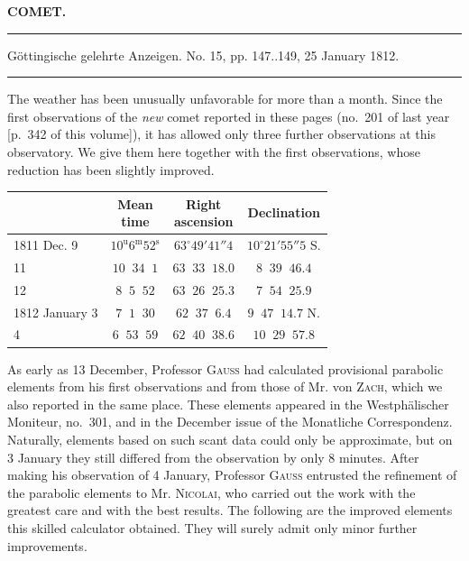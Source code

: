 \clearpage{}\hypertarget{native-350-lower}{}\label{native-350-lower}
\begin{center}\textbf{COMET.}\par\vspace{4pt}\hrule\vspace{4pt}\fontsize{10}{12}\selectfont Göttingische gelehrte Anzeigen. No. 15, pp. 147..149, 25 January 1812.\par\vspace{4pt}\hrule\vspace{4pt}\end{center}

\par\indent The weather has been unusually unfavorable for more than a month. Since the first observations of the \emph{new} comet reported in these pages (no.~201 of last year [p.~342 of this volume]), it has allowed only three further observations at this observatory. We give them here together with the first observations, whose reduction has been slightly improved.

\begin{center}
\fontsize{10}{12}\selectfont\setlength{\tabcolsep}{3pt}\renewcommand{\arraystretch}{1.15}\begin{tabular}{l|c|c|c}
 & \shortstack{Mean\\time} & \shortstack{Right\\ascension} & Declination \\
\hline
1811 Dec. 9 & $10^{\text{u}}6^{\text{m}}52^{\text{s}}$ & $63^\circ49'41''4$ & $10^\circ21'55''5$ S. \\
11 & $10\;\;34\;\;1$ & $63\;\;33\;\;18.0$ & $8\;\;39\;\;46.4$ \\
12 & $8\;\;5\;\;52$ & $63\;\;26\;\;25.3$ & $7\;\;54\;\;25.9$ \\
1812 January 3 & $7\;\;1\;\;30$ & $62\;\;37\;\;6.4$ & $9\;\;47\;\;14.7$ N. \\
4 & $6\;\;53\;\;59$ & $62\;\;40\;\;38.6$ & $10\;\;29\;\;57.8$ \\
\end{tabular}
\end{center}

\noindent As early as 13 December, Professor \textsc{Gauss} had calculated provisional parabolic elements from his first observations and from those of Mr. von \textsc{Zach}, which we also reported in the same place. These elements appeared in the Westphälischer Moniteur, no.~301, and in the December issue of the Monatliche Correspondenz. Naturally, elements based on such scant data could only be approximate, but on 3 January they still differed from the observation by only 8 minutes. After making his observation of 4 January, Professor \textsc{Gauss} entrusted the refinement of the parabolic elements to Mr. \textsc{Nicolai}, who carried out the work with the greatest care and with the best results. The following are the improved elements this skilled calculator obtained. They will surely admit only minor further improvements.


